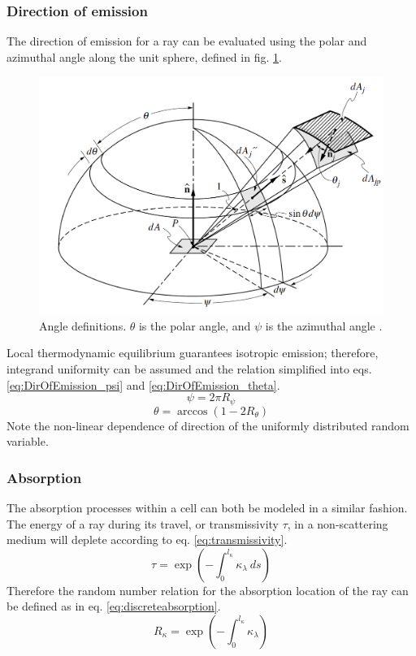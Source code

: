 \subsubsection{Direction of emission}
The direction of emission for a ray can be evaluated using the polar and azimuthal angle along the unit sphere, defined in fig. \ref{fig:Unit_Sphere}. 
\begin{figure}
\includegraphics[width=\linewidth]{figures/ch3/solid_angl.png}
\caption{Angle definitions. $\theta$ is the polar angle, and $\psi$ is the azimuthal angle \cite{Modest2013RadiativeTransfer}. }
\label{fig:Unit_Sphere}
\end{figure}
Local thermodynamic equilibrium guarantees isotropic emission; therefore, integrand uniformity can be assumed and the relation simplified into eqs. \ref{eq:DirOfEmission_psi} and \ref{eq:DirOfEmission_theta}.
\begin{equation}
    \psi{} = 2\pi{}R_\psi{}
    \label{eq:DirOfEmission_psi}
\end{equation}
\begin{equation}
    \theta{}=\arccos{(1-2R_\theta{})}
    \label{eq:DirOfEmission_theta}
\end{equation}
Note the non-linear dependence of direction of the uniformly distributed random variable.

\subsubsection{Absorption}
The absorption processes within a cell can both be modeled in a similar fashion. The energy of a ray during its travel, or transmissivity $\tau{}$, in a non-scattering medium will deplete according to eq. \ref{eq:transmissivity}.
\begin{equation}
    \tau{}=\exp{\left(-\int^{l_\kappa{}}_0\kappa{}_\lambda{}~ds\right)}
    \label{eq:transmissivity}
\end{equation}
Therefore the random number relation for the absorption location of the ray can be defined as in eq. \ref{eq:discreteabsorption}.
\begin{equation}
    R_\kappa{}=\exp{\left(-\int_0^{l_\kappa}\kappa_\lambda{}\right)}
    \label{eq:discreteabsorption}
\end{equation}

